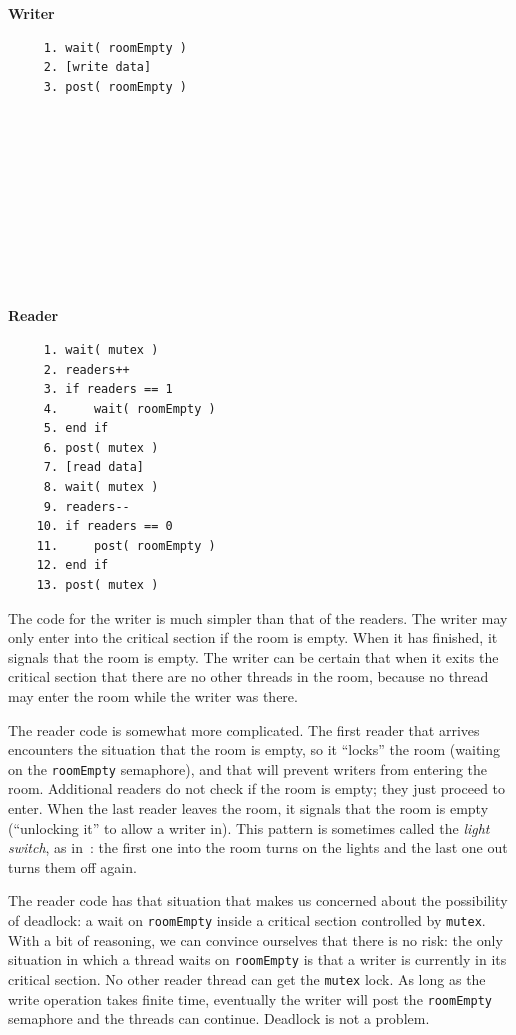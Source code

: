 \documentclass[a4paper]{report}
\begin{document}
\begin{multicols}{2}
	\textbf{Writer}\vspace{-2em}
	\begin{verbatim}
	 1. wait( roomEmpty )
	 2. [write data]
	 3. post( roomEmpty )
	 
	 
	 
	 
	 
	 
	 
	 
	 
	 
  \end{verbatim}
	\columnbreak
	\textbf{Reader}\vspace{-2em}
	\begin{verbatim}
	 1. wait( mutex )
	 2. readers++
	 3. if readers == 1
	 4.     wait( roomEmpty )
	 5. end if
	 6. post( mutex )
	 7. [read data]
	 8. wait( mutex )
	 9. readers--
	10. if readers == 0
	11.     post( roomEmpty )
	12. end if
	13. post( mutex )
  \end{verbatim}
\end{multicols}
\vspace{-2em}

The code for the writer is much simpler than that of the readers. The writer may only enter into the critical section if the room is empty. When it has finished, it signals that the room is empty. The writer can be certain that when it exits the critical section that there are no other threads in the room, because no thread may enter the room while the writer was there.

The reader code is somewhat more complicated. The first reader that arrives encounters the situation that the room is empty, so it ``locks'' the room (waiting on the \texttt{roomEmpty} semaphore), and that will prevent writers from entering the room. Additional readers do not check if the room is empty; they just proceed to enter. When the last reader leaves the room, it signals that the room is empty (``unlocking it'' to allow a writer in). This pattern is sometimes called the \textit{light switch}, as in~\cite{mte241}: the first one into the room turns on the lights and the last one out turns them off again.

The reader code has that situation that makes us concerned about the possibility of deadlock: a wait on \texttt{roomEmpty} inside a critical section controlled by \texttt{mutex}. With a bit of reasoning, we can convince ourselves that there is no risk: the only situation in which a thread waits on \texttt{roomEmpty} is that a writer is currently in its critical section. No other reader thread can get the \texttt{mutex} lock. As long as the write operation takes finite time, eventually the writer will post the \texttt{roomEmpty} semaphore and the threads can continue. Deadlock is not a problem.
\end{document}
